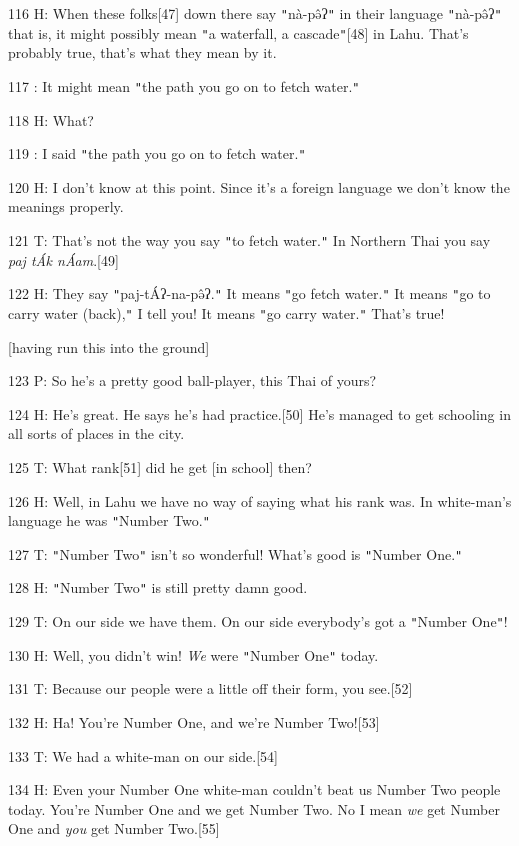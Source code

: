 116 H: When these folks[47] down there say \texttt{"}nà-pə̂ʔ\texttt{"} in their
language \texttt{"}nà-pə̂ʔ\texttt{"} that is, it might possibly mean \texttt{"}a
waterfall, a cascade\texttt{"}[48] in Lahu. That's probably true, that's what they
mean by it.

117    : It might mean \texttt{"}the path you go on to fetch water.\texttt{"}

118 H: What?

119    : I said \texttt{"}the path you go on to fetch water.\texttt{"}

120 H: I don't know at this point. Since it's a foreign language we don't know
the meanings properly.

121 T: That's not the way you say \texttt{"}to fetch water.\texttt{"} In Northern
Thai you say \textit{paj tÁk nÁam}.[49]

122 H: They say \texttt{"}paj-tÁʔ-na-pə̂ʔ.\texttt{"} It means \texttt{"}go
fetch water.\texttt{"} It means \texttt{"}go to carry water (back),\texttt{"} I
tell you! It means \texttt{"}go carry water.\texttt{"} That's true!

[having run this into the ground]

123 P: So he's a pretty good ball-player, this Thai of yours?

124 H: He's great. He says he's had practice.[50] He's managed to get schooling
in all sorts of places in the city.

125 T: What rank[51] did he get [in school] then?

126 H: Well, in Lahu we have no way of saying what his rank was. In white-man's
language he was \texttt{"}Number Two.\texttt{"}

127 T: \texttt{"}Number Two\texttt{"} isn't so wonderful! What's good is \texttt{"}Number
One.\texttt{"}

128 H: \texttt{"}Number Two\texttt{"} is still pretty damn good.

129 T: On our side we have them. On our side everybody's got a \texttt{"}Number
One\texttt{"}!

130 H: Well, you didn't win! \textit{We} were \texttt{"}Number One\texttt{"} today.

131 T: Because our people were a little off their form, you see.[52]

132 H: Ha! You're Number One, and we're Number Two![53]

133 T: We had a white-man on our side.[54]

134 H: Even your Number One white-man couldn't beat us Number Two people today.
You're Number One and we get Number Two. No I mean \textit{we} get Number One and
\textit{you} get Number Two.[55]

